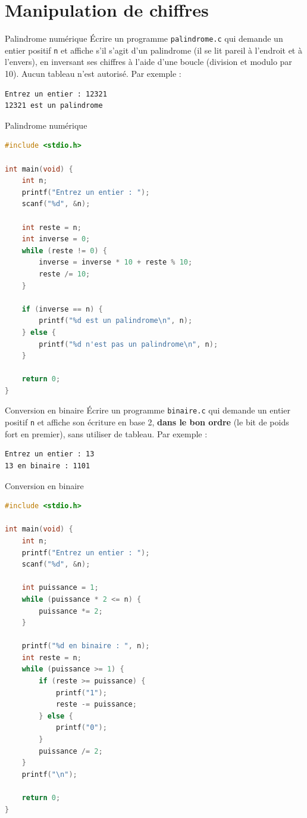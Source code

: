 \section{Manipulation de chiffres}

\begin{UPSTIexercice}{Palindrome numérique}
	\UPSTIetape Écrire un programme \texttt{palindrome.c} qui demande un entier positif \texttt{n} et affiche s'il s'agit d'un palindrome (il se lit pareil à l'endroit et à l'envers), en inversant ses chiffres à l'aide d'une boucle (division et modulo par 10). Aucun tableau n'est autorisé.
	Par exemple :
	\begin{lstlisting}[language=bash,style=console]
Entrez un entier : 12321
12321 est un palindrome
\end{lstlisting}
\end{UPSTIexercice}

\begin{UPSTIcorrectionP}{Palindrome numérique}
	\begin{lstlisting}[language=c]
#include <stdio.h>

int main(void) {
    int n;
    printf("Entrez un entier : ");
    scanf("%d", &n);

    int reste = n;
    int inverse = 0;
    while (reste != 0) {
        inverse = inverse * 10 + reste % 10;
        reste /= 10;
    }

    if (inverse == n) {
        printf("%d est un palindrome\n", n);
    } else {
        printf("%d n'est pas un palindrome\n", n);
    }

    return 0;
}
	\end{lstlisting}
\end{UPSTIcorrectionP}

\begin{UPSTIexercice}{Conversion en binaire}
	\UPSTIetape Écrire un programme \texttt{binaire.c} qui demande un entier positif \texttt{n} et affiche son écriture en base 2, \textbf{dans le bon ordre} (le bit de poids fort en premier), sans utiliser de tableau. 
	Par exemple :
	\begin{lstlisting}[language=bash,style=console]
Entrez un entier : 13
13 en binaire : 1101
\end{lstlisting}
\end{UPSTIexercice}

\begin{UPSTIcorrectionP}{Conversion en binaire}
	\begin{lstlisting}[language=c]
#include <stdio.h>

int main(void) {
    int n;
    printf("Entrez un entier : ");
    scanf("%d", &n);

    int puissance = 1;
    while (puissance * 2 <= n) {
        puissance *= 2;
    }

    printf("%d en binaire : ", n);
    int reste = n;
    while (puissance >= 1) {
        if (reste >= puissance) {
            printf("1");
            reste -= puissance;
        } else {
            printf("0");
        }
        puissance /= 2;
    }
    printf("\n");

    return 0;
}
	\end{lstlisting}
\end{UPSTIcorrectionP}
